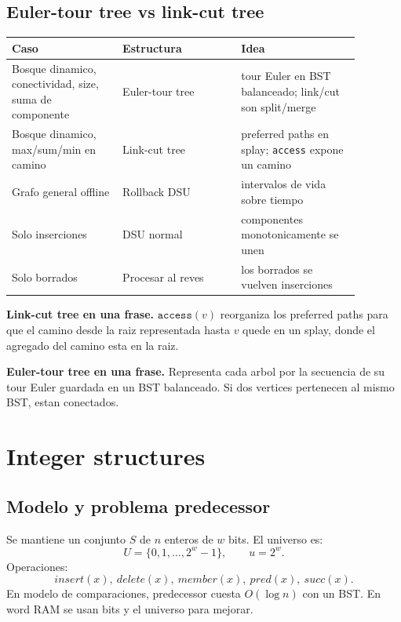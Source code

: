 \documentclass[10pt]{article}
\newcommand{\bigO}{O}
\newcommand{\boxhead}[1]{\vspace{3pt}\textbf{#1.}}
\begin{document}
\subsection{Euler-tour tree vs link-cut tree}
\begin{center}
\begin{tabular}{p{0.28\linewidth}p{0.30\linewidth}p{0.30\linewidth}}
\toprule
Caso & Estructura & Idea \\
\midrule
Bosque dinamico, conectividad, size, suma de componente & Euler-tour tree & tour Euler en BST balanceado; link/cut son split/merge \\
Bosque dinamico, max/sum/min en camino & Link-cut tree & preferred paths en splay; \texttt{access} expone un camino \\
Grafo general offline & Rollback DSU & intervalos de vida sobre tiempo \\
Solo inserciones & DSU normal & componentes monotonicamente se unen \\
Solo borrados & Procesar al reves & los borrados se vuelven inserciones \\
\bottomrule
\end{tabular}
\end{center}

\boxhead{Link-cut tree en una frase} \(\texttt{access}(v)\) reorganiza los preferred paths para que el camino
desde la raiz representada hasta \(v\) quede en un splay, donde el agregado del camino esta en la raiz.

\boxhead{Euler-tour tree en una frase} Representa cada arbol por la secuencia de su tour Euler guardada en un
BST balanceado. Si dos vertices pertenecen al mismo BST, estan conectados.

\newpage

\section{Integer structures}

\subsection{Modelo y problema predecessor}
Se mantiene un conjunto \(S\) de \(n\) enteros de \(w\) bits. El universo es:
\[
U=\{0,1,\ldots,2^w-1\},\qquad u=2^w.
\]
Operaciones:
\[
insert(x),\ delete(x),\ member(x),\ pred(x),\ succ(x).
\]
En modelo de comparaciones, predecessor cuesta \(\bigO(\log n)\) con un BST. En word RAM se usan bits y el
universo para mejorar.
\end{document}
